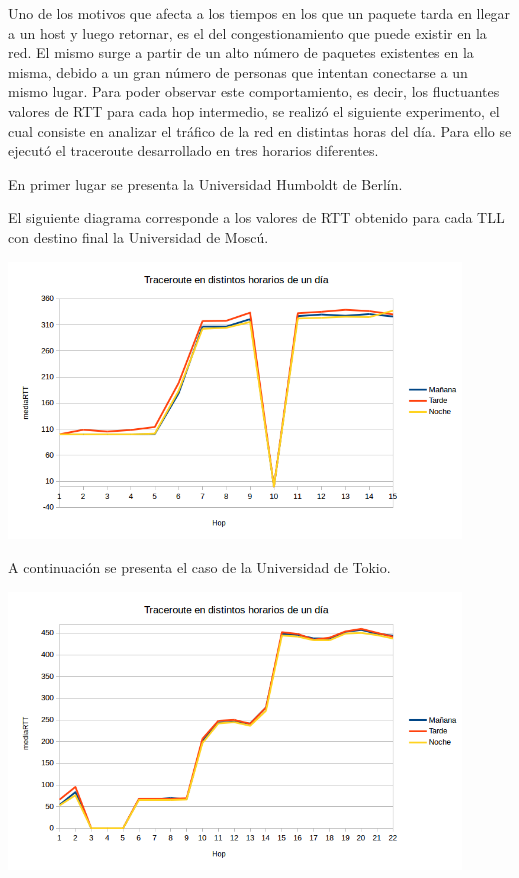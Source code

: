 Uno de los motivos que afecta a los tiempos en los que un paquete tarda en llegar a un host y luego retornar, es el del congestionamiento que puede existir en la red. El mismo surge a partir de un alto número de paquetes existentes en la misma, debido a un gran número de personas que intentan conectarse a un mismo lugar. Para poder observar este comportamiento, es decir, los fluctuantes valores de RTT para cada hop intermedio, se realizó el siguiente experimento, el cual consiste en analizar el tráfico de la red en distintas horas del día. Para ello se ejecutó el traceroute desarrollado en tres horarios diferentes. 

En primer lugar se presenta la Universidad Humboldt de Berlín. 


El siguiente diagrama corresponde a los valores de RTT obtenido para cada TLL con destino final la Universidad de Moscú.

\centerline{\includegraphics[width=0.9\textwidth]{imagenes/1ra_parte/trace_distintos_horarios_rusia.png}}

A continuación se presenta el caso de la Universidad de Tokio.

\centerline{\includegraphics[width=0.9\textwidth]{imagenes/1ra_parte/trace_distintos_horarios_japon.png}}

